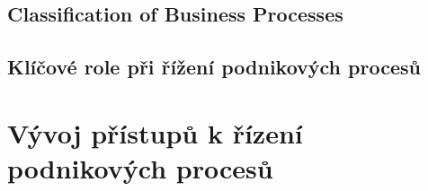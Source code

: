 \documentclass[]{article}
\begin{document}
\subsection{Classification of Business Processes}
\subsection{Klíčové role při řížení podnikových procesů}


\section{Vývoj přístupů k řízení podnikových procesů}



\end{document}
